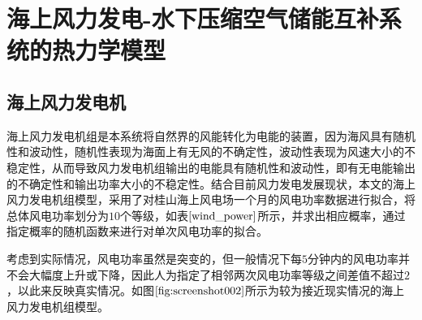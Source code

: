 \documentclass{jnuthesis}
\begin{document}
	
	
	
	
	\section{海上风力发电-水下压缩空气储能互补系统的热力学模型}
	\subsection{海上风力发电机}
	
	海上风力发电机组是本系统将自然界的风能转化为电能的装置，因为海风具有随机性和波动性，随机性表现为海面上有无风的不确定性，波动性表现为风速大小的不稳定性，从而导致风力发电机组输出的电能具有随机性和波动性，即有无电能输出的不确定性和输出功率大小的不稳定性。结合目前风力发电发展现状，本文的海上风力发电机组模型，采用了对桂山海上风电场一个月的风电功率数据进行拟合，将总体风电功率划分为$ 10 $个等级，如表$ \fontsize{10.5bp}{10pt}\ref{wind_power} $所示，并求出相应概率，通过指定概率的随机函数来进行对单次风电功率的拟合。
	
	
	\begin{table}[H]
		\centering
		\caption{\fontsize{10.5bp}{10pt}风功率等级及其概率\cite{b8}}
		\label{wind_power}
	\end{table}
	
	考虑到实际情况，风电功率虽然是突变的，但一般情况下每$ 5 $分钟内的风电功率并不会大幅度上升或下降，因此人为指定了相邻两次风电功率等级之间差值不超过$ 2 $，以此来反映真实情况。如图$ \fontsize{10.5bp}{10pt}\ref{fig:screenshot002} $所示为较为接近现实情况的海上风力发电机组模型。
	
\end{document}
